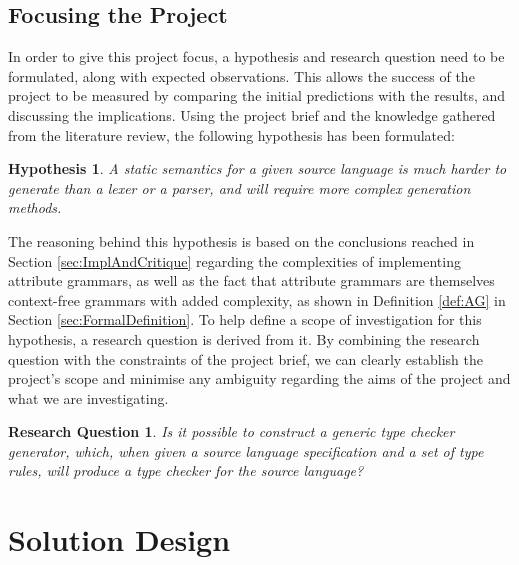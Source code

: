 \documentclass{UoYCSproject}
\newtheorem*{hypothesis}{Hypothesis}
\newtheorem*{researchquestion}{Research Question}
\begin{document}
\section{Focusing the Project}
In order to give this project focus, a hypothesis and research question need to
be formulated, along with expected observations. This allows the 
success of the project to be measured by comparing the initial predictions with 
the results, and discussing the implications. Using the project brief and the
knowledge gathered from the literature review, the following hypothesis has been
formulated:
\begin{hypothesis}
    A static semantics for a given source language is much harder to generate
    than a lexer or a parser, and will require more complex generation methods.
\end{hypothesis}
The reasoning behind this hypothesis is based on the conclusions reached in
Section \ref{sec:ImplAndCritique} regarding the complexities of implementing 
attribute grammars, as well as the fact that attribute grammars are 
themselves context-free grammars with added complexity, as shown in Definition 
\ref{def:AG} in Section \ref{sec:FormalDefinition}.
To help define a scope of investigation for this hypothesis, a research question 
is derived from it. By combining the research question with the constraints of the
project brief, we can clearly establish the project's scope and minimise any 
ambiguity regarding the aims of the project and what we are investigating.
\begin{researchquestion}
    Is it possible to construct a generic type checker generator, which, when 
    given a source language specification and a set of type rules, will produce 
    a type checker for the source language?
\end{researchquestion}


\chapter{Solution Design}
\end{document}
